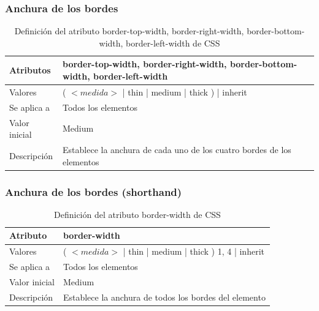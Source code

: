 \documentclass[ucs]{beamer}
\begin{document}

\begin{frame}
\frametitle{Anchura de los bordes}

\begin{center}
  \begin{table}
   \begin{tabular}{p{1.8cm}p{7.8cm}}
Atributos &\bf{border-top-width}, \bf{border-right-width}, \bf{border-bottom-width}, \bf{border-left-width} \\ \hline
Valores & ( $<medida>$ | thin | medium | thick ) | inherit \\ \hline
Se aplica a & Todos los elementos \\ \hline
Valor inicial & Medium \\ \hline
Descripción & Establece la anchura de cada uno de los cuatro bordes de los elementos \\ \hline
  \end{tabular}
   \caption{Definición del atributo border-top-width, border-right-width, border-bottom-width, border-left-width de CSS}
 \end{table}
\end{center}

\end{frame}


\begin{frame}
\frametitle{Anchura de los bordes (shorthand)}

\begin{center}
  \begin{table}
   \begin{tabular}{p{1.8cm}p{7.8cm}}
Atributo &\bf{border-width} \\ \hline
Valores & ( $<medida>$ | thin | medium | thick ) {1, 4} | inherit \\ \hline
Se aplica a & Todos los elementos \\ \hline
Valor inicial & Medium \\ \hline
Descripción & Establece la anchura de todos los bordes del elemento \\ \hline
  \end{tabular}
   \caption{Definición del atributo border-width de CSS}
 \end{table}
\end{center}

\end{frame}
\end{document}
